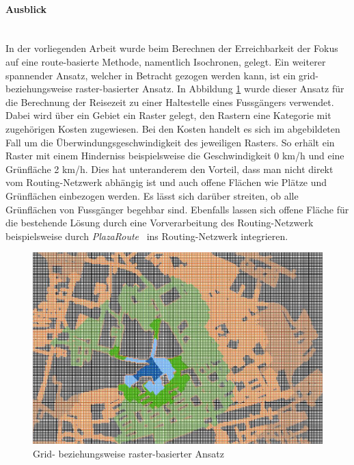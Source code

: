 \paragraph{Ausblick}~\\
In der vorliegenden Arbeit wurde beim Berechnen der Erreichbarkeit der Fokus auf eine route-basierte Methode, namentlich Isochronen, gelegt.
Ein weiterer spannender Ansatz, welcher in Betracht gezogen werden kann, ist ein grid- beziehungsweise raster-basierter Ansatz.
In Abbildung \ref{fig:grid_based_approach} wurde dieser Ansatz für die Berechnung der Reisezeit zu einer Haltestelle eines Fussgängers verwendet.
Dabei wird über ein Gebiet ein Raster gelegt, den Rastern eine Kategorie mit zugehörigen Kosten zugewiesen.
Bei den Kosten handelt es sich im abgebildeten Fall um die Überwindungsgeschwindigkeit des jeweiligen Rasters.
So erhält ein Raster mit einem Hinderniss beispielsweise die Geschwindigkeit 0 km/h und eine Grünfläche 2 km/h.
Dies hat unteranderem den Vorteil, dass man nicht direkt vom Routing-Netzwerk abhängig ist und auch offene Flächen wie Plätze und Grünflächen einbezogen werden.
Es lässt sich darüber streiten, ob alle Grünflächen von Fussgänger begehbar sind.
Ebenfalls lassen sich offene Fläche für die bestehende Lösung durch eine Vorverarbeitung des Routing-Netzwerk beispielsweise durch \emph{PlazaRoute}~\cite{plaza_route} ins Routing-Netzwerk integrieren.

\begin{figure}[ht]
    \centering
    \includegraphics[width=0.6\linewidth]{start/img/grid_based_approach.png}
    \caption[Grid- beziehungsweise raster-basierter Ansatz]{Grid- beziehungsweise raster-basierter Ansatz~\cite{pedestrian_accessibility_planning}}
    \label{fig:grid_based_approach}
\end{figure}
